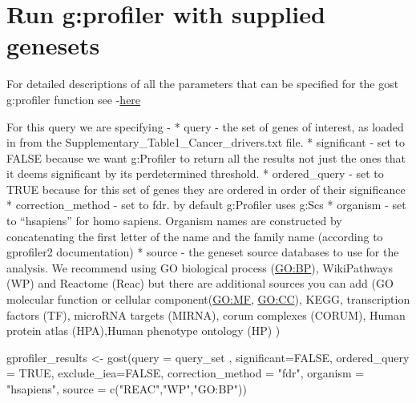 \documentclass[
]{book}
\newenvironment{Shaded}{\begin{snugshade}}{\end{snugshade}}
\newcommand{\AttributeTok}[1]{\textcolor[rgb]{0.77,0.63,0.00}{#1}}
\newcommand{\ConstantTok}[1]{\textcolor[rgb]{0.00,0.00,0.00}{#1}}
\newcommand{\FunctionTok}[1]{\textcolor[rgb]{0.00,0.00,0.00}{#1}}
\newcommand{\NormalTok}[1]{#1}
\newcommand{\OtherTok}[1]{\textcolor[rgb]{0.56,0.35,0.01}{#1}}
\newcommand{\StringTok}[1]{\textcolor[rgb]{0.31,0.60,0.02}{#1}}
\begin{document}
\hypertarget{run-gprofiler-with-supplied-genesets}{%
\section{Run g:profiler with supplied genesets}\label{run-gprofiler-with-supplied-genesets}}

For detailed descriptions of all the parameters that can be specified for the gost g:profiler function see -\href{https://rdrr.io/cran/gprofiler2/man/gost.html}{here}

For this query we are specifying -
* query - the set of genes of interest, as loaded in from the Supplementary\_Table1\_Cancer\_drivers.txt file.
* significant - set to FALSE because we want g:Profiler to return all the results not just the ones that it deems significant by its perdetermined threshold.
* ordered\_query - set to TRUE because for this set of genes they are ordered in order of their significance
* correction\_method - set to fdr. by default g:Profiler uses g:Scs
* organism - set to ``hsapiens'' for homo sapiens. Organism names are constructed by concatenating the first letter of the name and the family name (according to gprofiler2 documentation)
* source - the geneset source databases to use for the analysis. We recommend using GO biological process (\url{GO:BP}), WikiPathways (WP) and Reactome (Reac) but there are additional sources you can add (GO molecular function or cellular component(\url{GO:MF}, \url{GO:CC}), KEGG, transcription factors (TF), microRNA targets (MIRNA), corum complexes (CORUM), Human protein atlas (HPA),Human phenotype ontology (HP) )

\begin{Shaded}
\begin{Highlighting}[]
\NormalTok{gprofiler\_results }\OtherTok{\textless{}{-}} \FunctionTok{gost}\NormalTok{(}\AttributeTok{query =}\NormalTok{ query\_set ,}
                          \AttributeTok{significant=}\ConstantTok{FALSE}\NormalTok{,}
                          \AttributeTok{ordered\_query =} \ConstantTok{TRUE}\NormalTok{,}
                          \AttributeTok{exclude\_iea=}\ConstantTok{FALSE}\NormalTok{,}
                          \AttributeTok{correction\_method =} \StringTok{"fdr"}\NormalTok{,}
                          \AttributeTok{organism =} \StringTok{"hsapiens"}\NormalTok{,}
                          \AttributeTok{source =} \FunctionTok{c}\NormalTok{(}\StringTok{"REAC"}\NormalTok{,}\StringTok{"WP"}\NormalTok{,}\StringTok{"GO:BP"}\NormalTok{))}
\end{Highlighting}
\end{Shaded}
\end{document}
